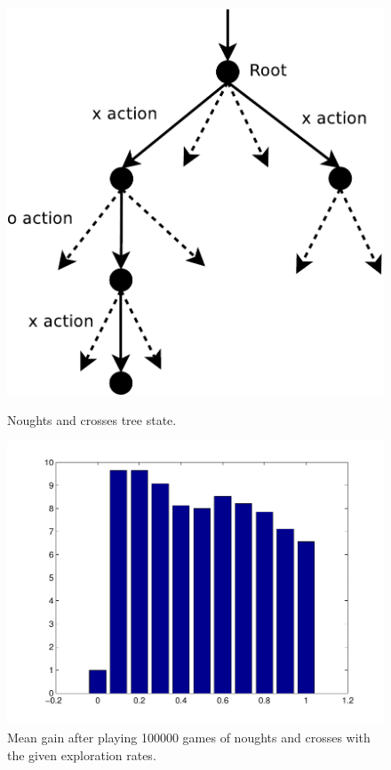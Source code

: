 \documentclass[12pt]{article}
\begin{document}
\begin{figure}[htbp!]
\centering
\begin{minipage}[t]{0.45\linewidth}
	\includegraphics[scale=0.4]{images/ttt_tree}
	\caption{Noughts and crosses tree state.}
	\label{fig:ttt_tree}
\end{minipage}
\quad
\begin{minipage}[t]{0.45\linewidth}
	\includegraphics[scale=0.40]{images/tttExpectedGain}
	\caption{Mean gain after playing 100000 games of noughts and crosses with the given exploration rates.}
	\label{fig:tttExpectedGain}
\end{minipage}
\end{figure}
\end{document}
